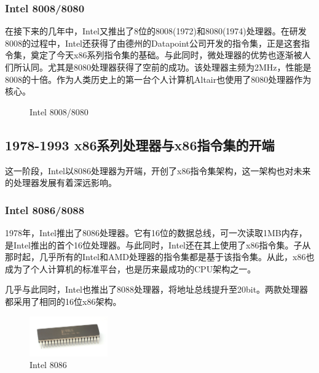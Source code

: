\documentclass[UTF8]{ctexart}
\begin{document}
\subsubsection{Intel 8008/8080}
在接下来的几年中，Intel又推出了8位的8008(1972)和8080(1974)处理器。在研发8008的过程中，Intel还获得了由德州的Datapoint公司开发的指令集，正是这套指令集，奠定了今天x86系列指令集的基础。与此同时，微处理器的优势也逐渐被人们所认同。尤其是8080处理器获得了空前的成功。该处理器主频为2MHz，性能是8008的十倍。作为人类历史上的第一台个人计算机Altair也使用了8080处理器作为核心。
\begin{figure}[H]
    \centering
    \caption{Intel 8008/8080}
\end{figure}

\subsection{1978-1993 x86系列处理器与x86指令集的开端}
这一阶段，Intel以8086处理器为开端，开创了x86指令集架构，这一架构也对未来的处理器发展有着深远影响。
\subsubsection{Intel 8086/8088}
1978年，Intel推出了8086处理器。它有16位的数据总线，可一次读取1MB内存，是Intel推出的首个16位处理器。与此同时，Intel还在其上使用了x86指令集。子从那时起，几乎所有的Intel和AMD处理器的指令集都是基于该指令集。从此，x86也成为了个人计算机的标准平台，也是历来最成功的CPU架构之一。

几乎与此同时，Intel也推出了8088处理器，将地址总线提升至20bit。两款处理器都采用了相同的16位x86架构。
\begin{figure}[H]
    \begin{center}
        \includegraphics[width=0.3\textwidth]{figure/8086.jpg}
        \caption{Intel 8086}
    \end{center}
\end{figure}
\end{document}
